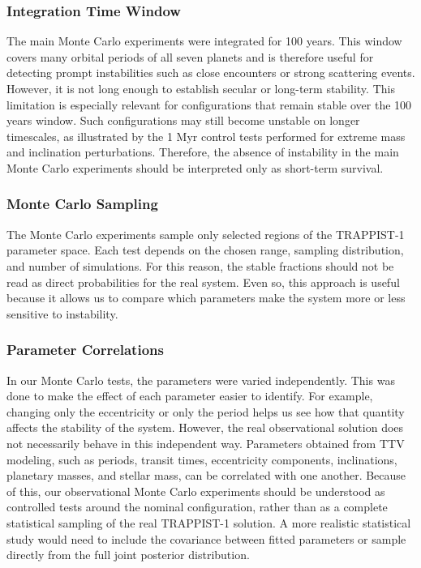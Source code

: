 \documentclass{aa}
\begin{document}
\subsubsection{Integration Time Window}
The main Monte Carlo experiments were integrated for 100 years. This window covers many orbital periods of all seven planets and is therefore useful for detecting prompt instabilities such as close encounters or strong scattering events. However, it is not long enough to establish secular or long-term stability. This limitation is especially relevant for configurations that remain stable over the 100 years window. Such configurations may still become unstable on longer timescales, as illustrated by the 1 Myr control tests performed for extreme mass and inclination perturbations. Therefore, the absence of instability in the main Monte Carlo experiments should be interpreted only as short-term survival.

\subsubsection{Monte Carlo Sampling}
The Monte Carlo experiments sample only selected regions of the TRAPPIST-1 parameter space. Each test depends on the chosen range, sampling distribution, and number of simulations. For this reason, the stable fractions should not be read as direct probabilities for the real system. Even so, this approach is useful because it allows us to compare which parameters make the system more or less sensitive to instability.

\subsubsection{Parameter Correlations}
In our Monte Carlo tests, the parameters were varied independently. This was done to make the effect of each parameter easier to identify. For example, changing only the eccentricity or only the period helps us see how that quantity affects the stability of the system. However, the real observational solution does not necessarily behave in this independent way. Parameters obtained from TTV modeling, such as periods, transit times, eccentricity components, inclinations, planetary masses, and stellar mass, can be correlated with one another. Because of this, our observational Monte Carlo experiments should be understood as controlled tests around the nominal configuration, rather than as a complete statistical sampling of the real TRAPPIST-1 solution. A more realistic statistical study would need to include the covariance between fitted parameters or sample directly from the full joint posterior distribution.
\end{document}

